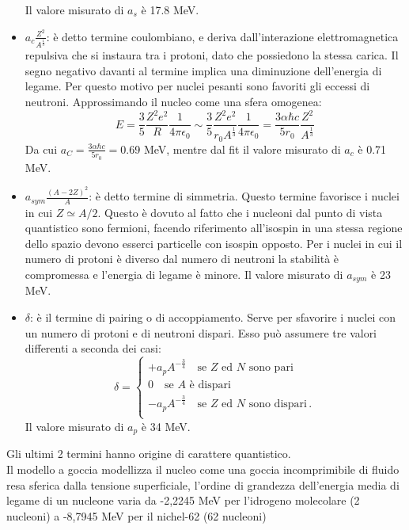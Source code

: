 \documentclass[twoside]{article}
\begin{document}
\begin{itemize}
    Il valore misurato di $a_s$ è 17.8 MeV.
    \item $a_c \frac{Z^2}{A^{\frac{1}{3}}}$: è detto termine coulombiano, e deriva dall'interazione elettromagnetica repulsiva che si instaura tra i protoni, dato che possiedono la stessa carica. Il segno negativo davanti al termine implica una diminuzione dell'energia di legame. Per questo motivo per nuclei pesanti sono favoriti gli eccessi di neutroni.
    Approssimando il nucleo come una sfera omogenea:
    \begin{equation}
        E=\frac{3}{5}\frac{Z^2e^2}{R}\frac{1}{4\pi\epsilon_0}\sim\frac{3}{5}\frac{Z^2e^2}{r_0A^{\frac{1}{3}}}\frac{1}{4\pi\epsilon_0}=\frac{3\alpha \hbar c}{5r_0}\frac{Z^2}{A^{\frac{1}{3}}}
    \end{equation}
    Da cui $a_C=\frac{3\alpha \hbar c}{5r_0}=$0.69 MeV, mentre dal fit il valore misurato di $a_c$ è 0.71 MeV.
    \item  $a_{sym}\frac{(A-2Z)^2}{A}$: è detto termine di simmetria. Questo termine favorisce i nuclei in cui $Z \simeq A/2$. Questo è dovuto al fatto che i nucleoni dal punto di vista quantistico sono fermioni, facendo riferimento all'isospin in una stessa regione dello spazio devono esserci particelle con isospin opposto. Per i nuclei in cui il numero di protoni è diverso dal numero di neutroni la stabilità è compromessa e l'energia di legame è minore. Il valore misurato di $a_{sym}$ è 23 MeV.
    \item $\delta$: è il termine di pairing o di accoppiamento. Serve per sfavorire i nuclei con un numero di protoni e di neutroni dispari. Esso può assumere tre valori differenti a seconda dei casi: 
\begin{equation}
\delta=
\begin{cases}
+a_p A^{-\frac{3}{4}} \quad \text{se $Z$ ed $N$ sono pari} \\
0 \quad \text{se $A$ è dispari} \\
-a_p A^{-\frac{3}{4}} \quad \text{se $Z$ ed $N$ sono dispari} \, . \\
\end{cases}
\end{equation}
Il valore misurato di $a_p$ è 34 MeV.
\end{itemize}
Gli ultimi 2 termini hanno origine di carattere quantistico.\\
Il modello a goccia modellizza il nucleo come una goccia incomprimibile di fluido resa sferica dalla tensione superficiale, l’ordine di
grandezza dell’energia media di legame di un nucleone varia da -2,2245 MeV per l'idrogeno molecolare (2 nucleoni) a -8,7945 MeV per il nichel-62 (62 nucleoni)
\end{document}
